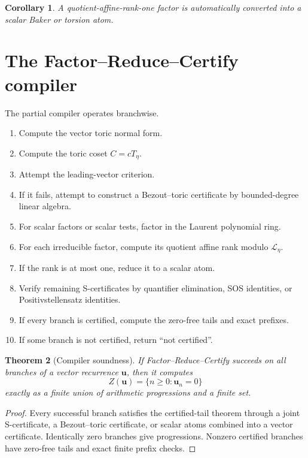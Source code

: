 \documentclass[11pt]{article}
\newtheorem{theorem}{Theorem}[section]
\newtheorem{corollary}[theorem]{Corollary}
\begin{document}
\begin{corollary}
A quotient-affine-rank-one factor is automatically converted into a scalar Baker or torsion atom.
\end{corollary}

\section{The Factor--Reduce--Certify compiler}

The partial compiler operates branchwise.
\begin{enumerate}
\item Compute the vector toric normal form.
\item Compute the toric coset \(C=cT_\eta\).
\item Attempt the leading-vector criterion.
\item If it fails, attempt to construct a Bezout--toric certificate by bounded-degree linear algebra.
\item For scalar factors or scalar tests, factor in the Laurent polynomial ring.
\item For each irreducible factor, compute its quotient affine rank modulo \(\mathcal L_\eta\).
\item If the rank is at most one, reduce it to a scalar atom.
\item Verify remaining S-certificates by quantifier elimination, SOS identities, or Positivstellensatz identities.
\item If every branch is certified, compute the zero-free tails and exact prefixes.
\item If some branch is not certified, return ``not certified''.
\end{enumerate}

\begin{theorem}[Compiler soundness]
If Factor--Reduce--Certify succeeds on all branches of a vector recurrence \(\mathbf u\), then it computes
\[
Z(\mathbf u)=\{n\ge0:\mathbf u_n=0\}
\]
exactly as a finite union of arithmetic progressions and a finite set.
\end{theorem}

\begin{proof}
Every successful branch satisfies the certified-tail theorem through a joint S-certificate, a Bezout--toric certificate, or scalar atoms combined into a vector certificate. Identically zero branches give progressions. Nonzero certified branches have zero-free tails and exact finite prefix checks.
\end{proof}
\end{document}
